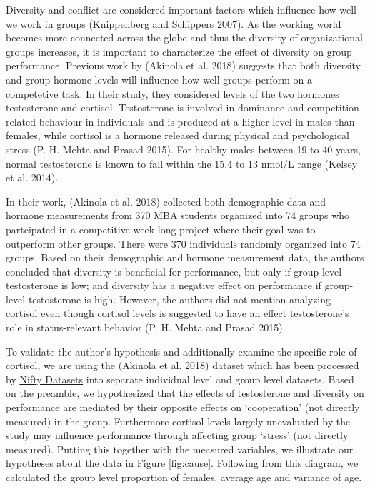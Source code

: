 \documentclass[]{article}
\begin{document}
Diversity and conflict are considered important factors which influence
how well we work in groups (Knippenberg and Schippers 2007). As the
working world becomes more connected across the globe and thus the
diversity of organizational groups increases, it is important to
characterize the effect of diversity on group performance. Previous work
by (Akinola et al. 2018) suggests that both diversity and group hormone
levels will influence how well groups perform on a competetive task. In
their study, they considered levels of the two hormones testosterone and
cortisol. Testosterone is involved in dominance and competition related
behaviour in individuals and is produced at a higher level in males than
females, while cortisol is a hormone released during physical and
psychological stress (P. H. Mehta and Prasad 2015). For healthy males
between 19 to 40 years, normal testosterone is known to fall within the
15.4 to 13 nmol/L range (Kelsey et al. 2014).

In their work, (Akinola et al. 2018) collected both demographic data and
hormone measurements from 370 MBA students organized into 74 groups who
partcipated in a competitive week long project where their goal was to
outperform other groups. There were 370 individuals randomly organized
into 74 groups. Based on their demographic and hormone measurement data,
the authors concluded that diversity is beneficial for performance, but
only if group-level testosterone is low; and diversity has a negative
effect on performance if group-level testosterone is high. However, the
authors did not mention analyzing cortisol even though cortisol levels
is suggested to have an effect testosterone's role in status-relevant
behavior (P. H. Mehta and Prasad 2015).

To validate the author's hypothesis and additionally examine the
specific role of cortisol, we are using the (Akinola et al. 2018)
dataset which has been processed by
\href{http://rosmarus.refsmmat.com/datasets/datasets/hormone-diversity/}{Nifty
Datasets} into separate individual level and group level datasets. Based
on the preamble, we hypothesized that the effects of testosterone and
diversity on performance are mediated by their opposite effects on
`cooperation' (not directly measured) in the group. Furthermore cortisol
levels largely unevaluated by the study may influence performance
through affecting group `stress' (not directly measured). Putting this
together with the measured variables, we illustrate our hypotheses about
the data in Figure \ref{fig:cause}. Following from this diagram, we
calculated the group level proportion of females, average age and
variance of age.
\end{document}
